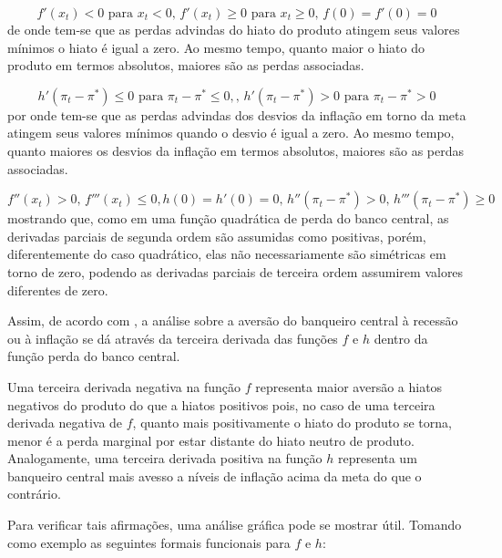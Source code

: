 \documentclass[
	article,			%
	11pt,				%
	oneside,			%
	a4paper,			%
	english,			%
	brazil,				%
	]{abntex2}
\begin{document}
	\begin{equation}
		f'(x_t) < 0 \mbox{ para } x_t < 0 \mbox{, } f'(x_t) \geq 0 \mbox{ para } x_t \geq 0 \mbox{, } f(0) = f'(0) = 0
	\end{equation}
	de onde tem-se que as perdas advindas do hiato do produto atingem seus valores mínimos o hiato é igual a zero. Ao mesmo tempo, quanto maior o hiato do produto em termos absolutos, maiores são as perdas associadas.

	\begin{equation}
		h'(\pi_t-\pi^*) \leq 0 \mbox{ para } \pi_t - \pi^* \leq 0, \nonumber \mbox{, } h'(\pi_t-\pi^*) > 0 \mbox{ para } \pi_t - \pi^* > 0 
	\end{equation}
	por onde tem-se que as perdas advindas dos desvios da inflação em torno da meta atingem seus valores mínimos quando o desvio é igual a zero. Ao mesmo tempo, quanto maiores os desvios da inflação em termos absolutos, maiores são as perdas associadas.
	
	\begin{equation}
		f''(x_t)>0 \mbox{, } f'''(x_t) \leq 0,\nonumber   h(0)=h'(0)=0 \mbox{, } h''(\pi_t-\pi^*)>0 \mbox{, } h'''(\pi_t-\pi^*) \geq 0
	\end{equation}
	mostrando que, como em uma função quadrática de perda do banco central, as derivadas parciais de segunda ordem são assumidas como positivas, porém, diferentemente do caso quadrático, elas não necessariamente são simétricas em torno de zero, podendo as derivadas parciais de terceira ordem assumirem valores diferentes de zero.
	
	Assim, de acordo com , a análise sobre a aversão do banqueiro central à recessão ou à inflação se dá através da terceira derivada das funções $f$ e $h$ dentro da função perda do banco central. 
	
	Uma terceira derivada negativa na função $f$ representa maior aversão a hiatos negativos do produto do que a hiatos positivos pois, no caso de uma terceira derivada negativa de $f$, quanto mais positivamente o hiato do produto se torna, menor é a perda marginal por estar distante do hiato neutro de produto. Analogamente, uma terceira derivada positiva na função $h$ representa um banqueiro central mais avesso a níveis de inflação acima da meta do que o contrário.	
	
	Para verificar tais afirmações, uma análise gráfica pode se mostrar útil. Tomando como exemplo as seguintes formais funcionais para $f$ e $h$:
	
\end{document}
